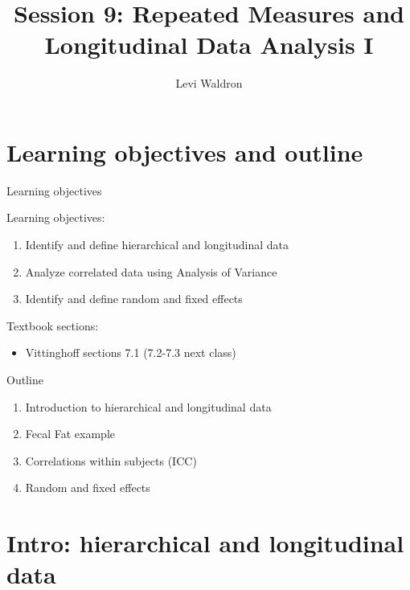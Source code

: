 \documentclass[
  ignorenonframetext,
]{beamer}
\title{Session 9: Repeated Measures and Longitudinal Data Analysis I}
\author{Levi Waldron}
\date{}
\institute{CUNY SPH Biostatistics 2}
\providecommand{\tightlist}{%
  \setlength{\itemsep}{0pt}\setlength{\parskip}{0pt}}
\begin{document}
\frame{\titlepage}

\hypertarget{learning-objectives-and-outline}{%
\section{Learning objectives and
outline}\label{learning-objectives-and-outline}}

\begin{frame}{Learning objectives}
\protect\hypertarget{learning-objectives}{}

Learning objectives:

\begin{enumerate}
\tightlist
\item
  Identify and define hierarchical and longitudinal data
\item
  Analyze correlated data using Analysis of Variance
\item
  Identify and define random and fixed effects
\end{enumerate}

Textbook sections:

\begin{itemize}
\tightlist
\item
  Vittinghoff sections 7.1 (7.2-7.3 next class)
\end{itemize}

\end{frame}

\begin{frame}{Outline}
\protect\hypertarget{outline}{}

\begin{enumerate}
\tightlist
\item
  Introduction to hierarchical and longitudinal data
\item
  Fecal Fat example
\item
  Correlations within subjects (ICC)
\item
  Random and fixed effects
\end{enumerate}

\end{frame}

\hypertarget{intro-hierarchical-and-longitudinal-data}{%
\section{Intro: hierarchical and longitudinal
data}\label{intro-hierarchical-and-longitudinal-data}}
\end{document}
